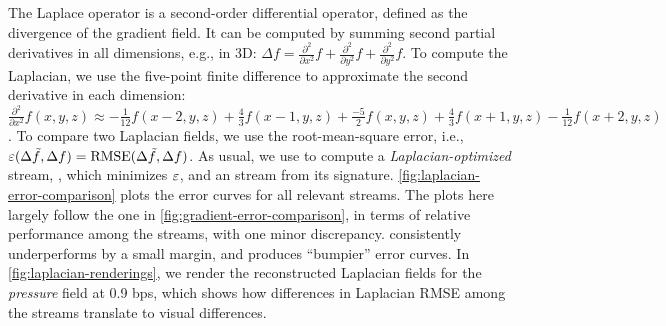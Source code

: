 The Laplace operator is a second-order differential operator, defined as the
divergence of the gradient field. It can be computed by summing second partial
derivatives in all dimensions, e.g., in 3D: $\Delta
f=\frac{{\partial}^2}{\partial{x^2}}f+\frac{{\partial}^2}{\partial{y^2}}f+\frac{{\partial}^2}{\partial{y^2}}f$.
 To compute the Laplacian, we use the five-point finite difference to
approximate the second derivative in each dimension:
$\frac{{\partial}^2}{\partial{x^2}}f(x,y,z) \approx
-\frac{1}{12}f(x-2,y,z)+\frac{4}{3}f(x-1,y,z)+\frac{-5}{2}f(x,y,z)+\frac{4}{3}f(x+1,y,z)-\frac{1}{12}f(x+2,y,z)$.
To compare two Laplacian fields, we use the root-mean-square error, i.e.,
$\err(\Delta \tilde{f},\Delta f)=\text{RMSE}(\Delta \tilde{f},\Delta f)$.
 As usual, we use  to compute a
\emph{Laplacian-optimized} stream, \slop, which minimizes $\err$, and an \slsg
stream from its signature. \autoref{fig:laplacian-error-comparison} plots the
error curves for all relevant streams. The plots here largely follow the one in
\autoref{fig:gradient-error-comparison}, in terms of relative performance among
the streams, with one minor discrepancy. \sbit consistently underperforms \slsg
by a small margin, and produces ``bumpier'' error curves. In
\autoref{fig:laplacian-renderings}, we render the reconstructed Laplacian
fields for the \emph{pressure} field at 0.9 bps, which shows how differences in
Laplacian RMSE  among the streams translate to
visual differences.
